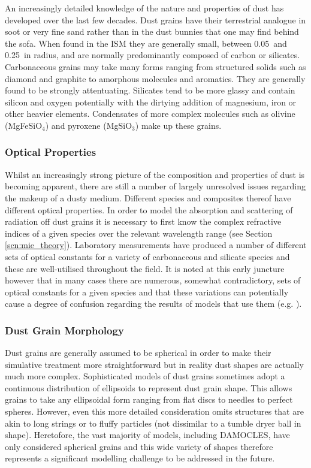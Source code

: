 An increasingly detailed knowledge of the nature and properties of dust has developed over the last few decades. Dust grains have their terrestrial analogue in soot or very fine sand rather than in the dust bunnies that one may find behind the sofa.  When found in the ISM they are generally small, between 0.05\micron\ and 0.25\micron\ in radius, and are normally predominantly composed of carbon or silicates.  Carbonaceous grains may take many forms ranging from structured solids such as diamond and graphite to amorphous molecules and aromatics.  They are generally found to be strongly attentuating.  Silicates tend to be more glassy and contain silicon and oxygen potentially with the dirtying addition of magnesium, iron or other heavier elements.  Condensates of more complex molecules such as olivine (MgFeSiO$_4$) and pyroxene (MgSiO$_3$) make up these grains.  

\subsubsection{Optical Properties}
\label{opt_prop}
Whilst an increasingly strong picture of the composition and properties of dust is becoming apparent, there are still a number of largely unresolved issues regarding the makeup of a dusty medium.
Different species and composites thereof have different optical properties.  In order to model the absorption and scattering of radiation off dust grains it is necessary to first know the complex refractive indices of a given species over the relevant wavelength range (see Section \ref{scn:mie_theory}).  Laboratory measurements have produced a number of different sets of optical constants for a variety of carbonaceous and silicate species and these are well-utilised throughout the field.  It is noted at this early juncture however that in many cases there are numerous, somewhat contradictory, sets of optical constants for a given species and that these variations can potentially cause a degree of confusion regarding the results of models that use them (e.g. \citet{Owen2015}).  

\subsubsection{Dust Grain Morphology}

Dust grains are generally assumed to be spherical in order to make their simulative treatment more straightforward but in reality dust shapes are actually much more complex.  Sophisticated models of dust grains sometimes adopt a continuous distribution of ellipsoids to represent dust grain shape.  This allows grains to take any ellipsoidal form ranging from flat discs to needles to perfect spheres.  However, even this more detailed consideration omits structures that are akin to long strings or to fluffy particles (not dissimilar to a tumble dryer ball in shape). Heretofore, the vast majority of models, including DAMOCLES, have only considered spherical grains and this wide variety of shapes therefore represents a significant modelling challenge to be addressed in the future.

